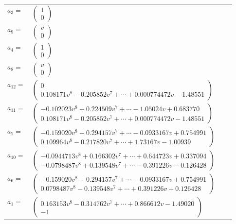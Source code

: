 \documentclass[1p]{elsarticle_modified}
\theoremstyle{definition}
\begin{document}
\begin{tabular}{m{7pt} m{180pt} m{7pt} m{180pt} }
\flushright $a_{3}=$&$\begin{pmatrix}1\\0\end{pmatrix}$ \\
\flushright $a_{9}=$&$\begin{pmatrix}v\\0\end{pmatrix}$ \\
\flushright $a_{4}=$&$\begin{pmatrix}1\\0\end{pmatrix}$ \\
\flushright $a_{8}=$&$\begin{pmatrix}v\\0\end{pmatrix}$ \\
\flushright $a_{12}=$&$\begin{pmatrix}0\\0.108171 v^{8}-0.205852 v^{7}+\cdots+0.000774472 v-1.48551\end{pmatrix}$ \\
\flushright $a_{11}=$&$\begin{pmatrix}-0.102023 v^{8}+0.224509 v^{7}+\cdots-1.05024 v+0.683770\\0.108171 v^{8}-0.205852 v^{7}+\cdots+0.000774472 v-1.48551\end{pmatrix}$ \\
\flushright $a_{7}=$&$\begin{pmatrix}-0.159020 v^{8}+0.294157 v^{7}+\cdots-0.0933167 v+0.754991\\0.109964 v^{8}-0.217820 v^{7}+\cdots+1.73167 v-1.00939\end{pmatrix}$ \\
\flushright $a_{10}=$&$\begin{pmatrix}-0.0944713 v^{8}+0.166302 v^{7}+\cdots+0.644723 v+0.337094\\-0.0798487 v^{8}+0.139548 v^{7}+\cdots-0.391226 v-0.126428\end{pmatrix}$ \\
\flushright $a_{6}=$&$\begin{pmatrix}-0.159020 v^{8}+0.294157 v^{7}+\cdots-0.0933167 v+0.754991\\0.0798487 v^{8}-0.139548 v^{7}+\cdots+0.391226 v+0.126428\end{pmatrix}$ \\
\flushright $a_{1}=$&$\begin{pmatrix}0.163153 v^{8}-0.314762 v^{7}+\cdots+0.866612 v-1.49020\\-1\end{pmatrix}$ \\

\end{tabular}
\end{document}
